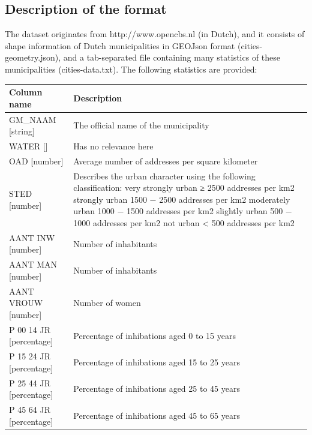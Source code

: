\documentclass[a4paper,twoside,11pt]{article}
\begin{document}
\subsection{Description of the format}
The dataset originates from http://www.opencbs.nl (in Dutch), and it consists of shape information of Dutch municipalities in GEOJson format (cities-geometry.json), and a
tab-separated file containing many statistics of these municipalities (cities-data.txt). \newline
The following statistics are provided: \newline
\begin{center}
    \begin{tabular}{ | p{4.9cm} | p{10cm} |}
    \hline
    \textbf{Column name} & \textbf{Description} \\ \hline
        GM\_NAAM [string] & The official name of the municipality \\ \hline
        WATER [] & Has no relevance here \\ \hline
        OAD [number] & Average number of addresses per square kilometer \\ \hline
        STED [number] & Describes the urban character using the following classification: \newline
                        1 very strongly urban ≥ 2500 addresses per km2 \newline
                        2 strongly urban 1500 − 2500 addresses per km2 \newline
                        3 moderately urban 1000 − 1500 addresses per km2 \newline
                        4 slightly urban 500 − 1000 addresses per km2 \newline
                        5 not urban < 500 addresses per km2  \\ \hline
        AANT INW [number] & Number of inhabitants \\ \hline
        AANT MAN [number] & Number of inhabitants \\ \hline
        AANT VROUW [number] & Number of women \\ \hline
        P 00 14 JR [percentage] & Percentage of inhibations aged 0 to 15 years \\ \hline
        P 15 24 JR [percentage] & Percentage of inhibations aged 15 to 25 years \\ \hline
        P 25 44 JR [percentage] & Percentage of inhibations aged 25 to 45 years \\ \hline
        P 45 64 JR [percentage] & Percentage of inhibations aged 45 to 65 years \\ \hline
    \end{tabular}
\end{center}
\end{document}
